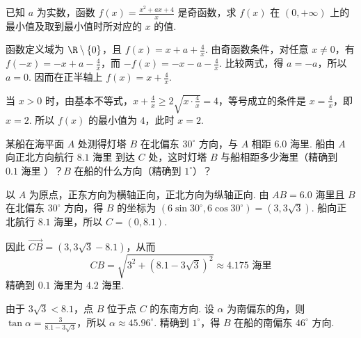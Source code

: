 \begin{problem}
已知 \(a\) 为实数，函数 \( f(x)=\frac{x^{2}+ax+4}{x} \) 是奇函数，求 \( f(x) \) 在 \( (0,+\infty) \) 上的最小值及取到最小值时所对应的 \(x\) 的值.

\begin{solution}
函数定义域为 \(\R\mathbin{\backslash}\{0\}\)，且 \(f(x)=x+a+\frac4x\). 由奇函数条件，对任意 \(x\neq0\)，有 \(f(-x)=-x+a-\frac4x\)，而 \(-f(x)=-x-a-\frac4x\).
比较两式，得 \(a=-a\)，所以 \(a=0\). 因而在正半轴上 \(f(x)=x+\frac4x\).

当 \(x>0\) 时，由基本不等式，\(x+\frac4x\geq2\sqrt{x\cdot\frac4x}=4\)，等号成立的条件是 \(x=\frac4x\)，即 \(x=2\). 所以 \(f(x)\) 的最小值为 \(4\)，此时 \(x=2\).
\end{solution}
\end{problem}

\begin{problem}
某船在海平面 \(A\) 处测得灯塔 \(B\) 在北偏东 \( 30^{\circ} \) 方向，与 \(A\) 相距 \(6.0\text{ 海里}\). 船由 \(A\) 向正北方向航行 \(8.1\text{ 海里}\) 到达 \(C\) 处，这时灯塔 \(B\) 与船相距多少海里（精确到 \(0.1\text{ 海里} \) ）？\(B\) 在船的什么方向（精确到 \(1^{\circ}\)）？

\begin{solution}
以 \(A\) 为原点，正东方向为横轴正向，正北方向为纵轴正向. 由 \(AB=6.0\) 海里且 \(B\) 在北偏东 \(30^{\circ}\) 方向，得 \(B\) 的坐标为 \(\left(6\sin30^{\circ},6\cos30^{\circ}\right)=\left(3,3\sqrt3\right)\). 船向正北航行 \(8.1\) 海里，所以 \(C=(0,8.1)\).

因此 \(\overrightarrow{CB}=\left(3,3\sqrt3-8.1\right)\)，从而
\[
CB=\sqrt{3^2+(8.1-3\sqrt3)^2}\approx4.175\text{ 海里}
\]
精确到 \(0.1\) 海里为 \(4.2\) 海里.

由于 \(3\sqrt3<8.1\)，点 \(B\) 位于点 \(C\) 的东南方向. 设 \(\alpha\) 为南偏东的角，则 \(\tan\alpha=\frac{3}{8.1-3\sqrt3}\)，所以 \(\alpha\approx45.96^{\circ}\). 精确到 \(1^{\circ}\)，得 \(B\) 在船的南偏东 \(46^{\circ}\) 方向.
\end{solution}
\end{problem}

